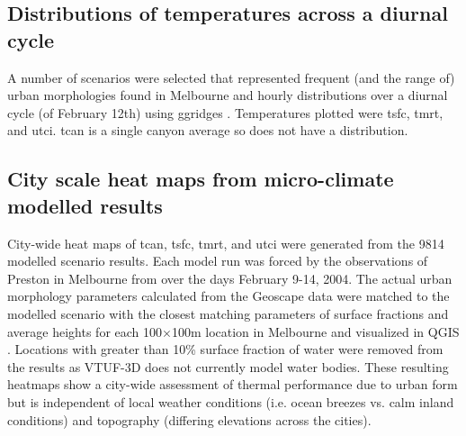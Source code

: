 \documentclass[final,3p,times,authoryear]{elsarticle}
\begin{document}
\subsection{Distributions of temperatures across a diurnal cycle}\label{sec:methodsdist}
%
% 

A number of scenarios were selected that represented frequent (and the range of) urban morphologies found in Melbourne and hourly distributions over a diurnal cycle (of February 12th) using ggridges \citep{ggridges}. Temperatures plotted were \gls{tsfc}, \gls{tmrt}, and \gls{utci}. \gls{tcan} is a single canyon average so does not have a distribution.


\subsection{City scale heat maps from micro-climate modelled results}\label{sec:methodsheatmaps}

City-wide heat maps of \gls{tcan}, \gls{tsfc}, \gls{tmrt}, and \gls{utci} were generated from the 9814 modelled scenario results. Each model run was forced by the observations of Preston in Melbourne from \cite{Coutts2007} over the days February 9-14, 2004. The actual urban morphology parameters calculated from the Geoscape data were matched to the modelled scenario with the closest matching parameters of surface fractions and average heights for each 100$\times$100m location in Melbourne and visualized in QGIS \citep{QGIS2009}. Locations with greater than 10\% surface fraction of water were removed from the results as VTUF-3D does not currently model water bodies. These resulting heatmaps show a city-wide assessment of thermal performance due to urban form but is independent of local weather conditions (i.e. ocean breezes vs. calm inland conditions) and topography (differing elevations across the cities). 
\end{document}
